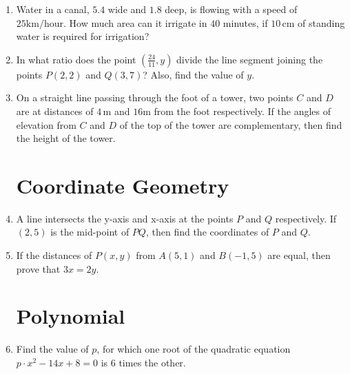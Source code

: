 \documentclass[12pt, letterpaper]{article}
\begin{document}
\begin{enumerate}
    \item Water in a canal, $5.4$ wide and $1.8$ deep, is flowing with a speed of $25\mathrm{km/hour}$. How much area can it irrigate in $40$ minutes, if $10\,\mathrm{cm}$ of standing water is required for irrigation?
    \item In what ratio does the point $ \left(\frac{24}{11}, y \right) $ divide the line segment joining the points $P(2, 2)$ and $Q(3, 7)$? Also, find the value of $y$.
    \item On a straight line passing through the foot of a tower, two points $C$ and $D$ are at distances of $4\,\mathrm{m}$ and $16\mathrm{m}$ from the foot respectively. If the angles of elevation from $C$ and $D$ of the top of the tower are complementary, then find the height of the tower.

    \section*{Coordinate Geometry}
    \item A line intersects the y-axis and x-axis at the points $P$ and $Q$ respectively. If $(2,5)$ is the mid-point of $PQ$, then find the coordinates of $P$ and $Q$.
    \item If the distances of $P(x, y)$ from $A(5, 1)$ and $B(-1, 5)$ are equal, then prove that $3x = 2y$.

    \section*{Polynomial}
    \item Find the value of $p$, for which one root of the quadratic equation $p \cdot x^2 - 14x + 8 = 0$ is 6 times the other.
\end{enumerate}
\end{document}
